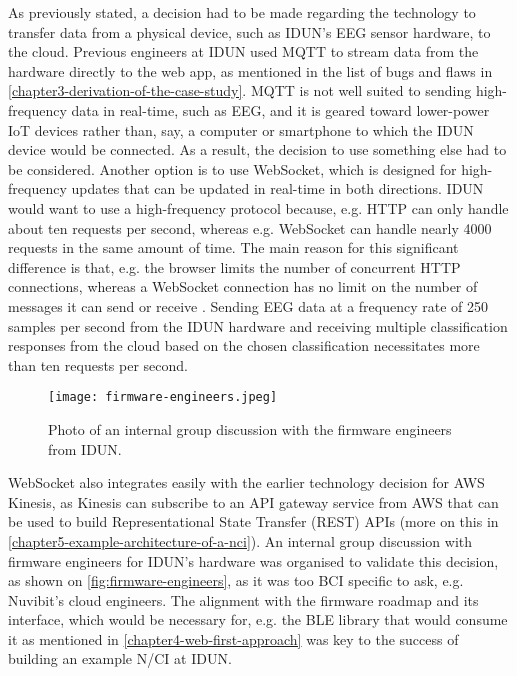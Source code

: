As previously stated, a decision had to be made regarding the technology to transfer data from a physical device, such as IDUN's EEG sensor hardware, to the cloud. Previous engineers at IDUN used MQTT to stream data from the hardware directly to the web app, as mentioned in the list of bugs and flaws in \autoref{chapter3-derivation-of-the-case-study}. MQTT is not well suited to sending high-frequency data in real-time, such as EEG, and it is geared toward lower-power IoT devices rather than, say, a computer or smartphone to which the IDUN device would be connected. As a result, the decision to use something else had to be considered. Another option is to use WebSocket, which is designed for high-frequency updates that can be updated in real-time in both directions. IDUN would want to use a high-frequency protocol because, e.g. HTTP can only handle about ten requests per second, whereas e.g. WebSocket can handle nearly 4000 requests in the same amount of time. The main reason for this significant difference is that, e.g. the browser limits the number of concurrent HTTP connections, whereas a WebSocket connection has no limit on the number of messages it can send or receive \citep{luecke_http_2018}. Sending EEG data at a frequency rate of 250 samples per second from the IDUN hardware and receiving multiple classification responses from the cloud based on the chosen classification necessitates more than ten requests per second.

\begin{figure}[!ht]
  \centering
  \texttt{[image: firmware-engineers.jpeg]}
  \caption{Photo of an internal group discussion with the firmware engineers from IDUN.}
  \label{fig:firmware-engineers}
\end{figure}

WebSocket also integrates easily with the earlier technology decision for AWS Kinesis, as Kinesis can subscribe to an API gateway service from AWS that can be used to build Representational State Transfer (REST) APIs (more on this in \autoref{chapter5-example-architecture-of-a-nci}). An internal group discussion with firmware engineers for IDUN's hardware was organised to validate this decision, as shown on \autoref{fig:firmware-engineers}, as it was too BCI specific to ask, e.g. Nuvibit's cloud engineers. The alignment with the firmware roadmap and its interface, which would be necessary for, e.g. the BLE library that would consume it as mentioned in \autoref{chapter4-web-first-approach} was key to the success of building an example N/CI at IDUN.

